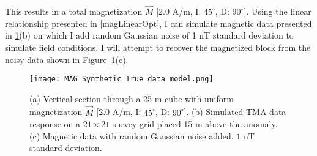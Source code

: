 This results in a total magnetization $\vec{M}$ [2.0 A/m, I: $45^\circ$, D: $90^\circ$]. Using the linear relationship presented in \eqref{magLinearOpt}, I can simulate magnetic data presented in \ref{MAG_model}(b) on which I add random Gaussian noise of 1 nT standard deviation to simulate field conditions.
I will attempt to recover the magnetized block from the noisy data shown in Figure~\ref{MAG_model}(c).
\begin{figure}[h!]
{\centering
\texttt{[image: MAG\_Synthetic\_True\_data\_model.png]}}
\caption{(a) Vertical section through a 25 m cube with uniform magnetization $\vec{M}$ [2.0 A/m, I: $45^\circ$, D: $90^\circ$]. (b) Simulated TMA data response on a $21 \times 21$ survey grid placed 15 m above the anomaly. (c) Magnetic data with random Gaussian noise added, $1$ nT standard deviation.}
\label{MAG_model}
\end{figure}

